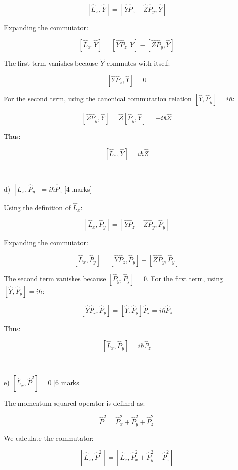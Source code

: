 \documentclass{article}
\begin{document}
\[
\left[\hat{L}_x, \hat{Y}\right] = \left[\hat{Y}\hat{P}_z - \hat{Z}\hat{P}_y, \hat{Y}\right]
\]

Expanding the commutator:

\[
\left[\hat{L}_x, \hat{Y}\right] = \left[\hat{Y}\hat{P}_z, \hat{Y}\right] - \left[\hat{Z}\hat{P}_y, \hat{Y}\right]
\]

The first term vanishes because \(\hat{Y}\) commutes with itself:

\[
\left[\hat{Y}\hat{P}_z, \hat{Y}\right] = 0
\]

For the second term, using the canonical commutation relation \([\hat{Y}, \hat{P}_y] = i\hbar\):

\[
\left[\hat{Z}\hat{P}_y, \hat{Y}\right] = \hat{Z} \left[\hat{P}_y, \hat{Y}\right] = -i\hbar \hat{Z}
\]

Thus:

\[
\left[\hat{L}_x, \hat{Y}\right] = i\hbar \hat{Z}
\]

---

d) \(\left[\hat{L}_x, \hat{P}_y\right] = i\hbar \hat{P}_z\) [4 marks]  

Using the definition of \(\hat{L}_x\):

\[
\left[\hat{L}_x, \hat{P}_y\right] = \left[\hat{Y}\hat{P}_z - \hat{Z}\hat{P}_y, \hat{P}_y\right]
\]

Expanding the commutator:

\[
\left[\hat{L}_x, \hat{P}_y\right] = \left[\hat{Y}\hat{P}_z, \hat{P}_y\right] - \left[\hat{Z}\hat{P}_y, \hat{P}_y\right]
\]

The second term vanishes because \([\hat{P}_y, \hat{P}_y] = 0\). For the first term, using \([\hat{Y}, \hat{P}_y] = i\hbar\):

\[
\left[\hat{Y}\hat{P}_z, \hat{P}_y\right] = \left[\hat{Y}, \hat{P}_y\right]\hat{P}_z = i\hbar \hat{P}_z
\]

Thus:

\[
\left[\hat{L}_x, \hat{P}_y\right] = i\hbar \hat{P}_z
\]

---

e) \(\left[\hat{L}_x, \hat{P}^2\right] = 0\) [6 marks]  

The momentum squared operator is defined as:

\[
\hat{P}^2 = \hat{P}_x^2 + \hat{P}_y^2 + \hat{P}_z^2
\]

We calculate the commutator:

\[
\left[\hat{L}_x, \hat{P}^2\right] = \left[\hat{L}_x, \hat{P}_x^2 + \hat{P}_y^2 + \hat{P}_z^2\right]
\]
\end{document}
